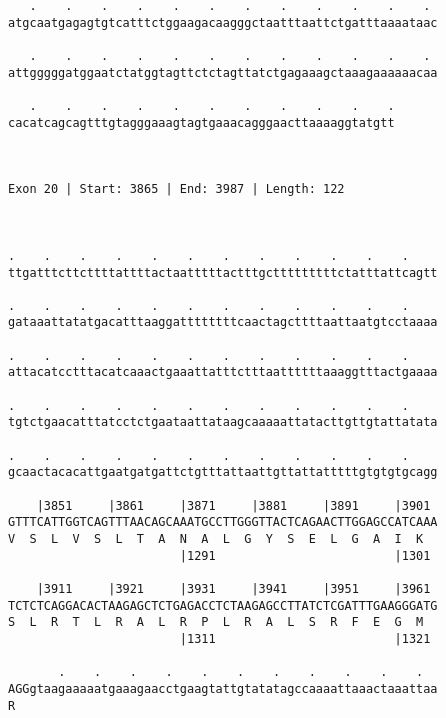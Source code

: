 \documentclass{article}
\begin{document}
\begin{Verbatim}
   .    .    .    .    .    .    .    .    .    .    .    . 
atgcaatgagagtgtcatttctggaagacaagggctaatttaattctgatttaaaataac
                                                            
   .    .    .    .    .    .    .    .    .    .    .    . 
attgggggatggaatctatggtagttctctagttatctgagaaagctaaagaaaaaacaa
                                                            
   .    .    .    .    .    .    .    .    .    .    .
cacatcagcagtttgtagggaaagtagtgaaacagggaacttaaaaggtatgtt
                                                      
                                                      
 
Exon 20 | Start: 3865 | End: 3987 | Length: 122



.    .    .    .    .    .    .    .    .    .    .    .    
ttgatttcttcttttattttactaatttttactttgctttttttttctatttattcagtt
                                                            
.    .    .    .    .    .    .    .    .    .    .    .    
gataaattatatgacatttaaggattttttttcaactagcttttaattaatgtcctaaaa
                                                            
.    .    .    .    .    .    .    .    .    .    .    .    
attacatcctttacatcaaactgaaattatttctttaattttttaaaggtttactgaaaa
                                                            
.    .    .    .    .    .    .    .    .    .    .    .    
tgtctgaacatttatcctctgaataattataagcaaaaattatacttgttgtattatata
                                                            
.    .    .    .    .    .    .    .    .    .    .    .    
gcaactacacattgaatgatgattctgtttattaattgttattatttttgtgtgtgcagg
                                                            
    |3851     |3861     |3871     |3881     |3891     |3901 
GTTTCATTGGTCAGTTTAACAGCAAATGCCTTGGGTTACTCAGAACTTGGAGCCATCAAA
V  S  L  V  S  L  T  A  N  A  L  G  Y  S  E  L  G  A  I  K  
                        |1291                         |1301 
  
    |3911     |3921     |3931     |3941     |3951     |3961 
TCTCTCAGGACACTAAGAGCTCTGAGACCTCTAAGAGCCTTATCTCGATTTGAAGGGATG
S  L  R  T  L  R  A  L  R  P  L  R  A  L  S  R  F  E  G  M  
                        |1311                         |1321 
  
       .    .    .    .    .    .    .    .    .    .    .  
AGGgtaagaaaaatgaaagaacctgaagtattgtatatagccaaaattaaactaaattaa
R                                                           
                                                            

\end{Verbatim}
\end{document}
